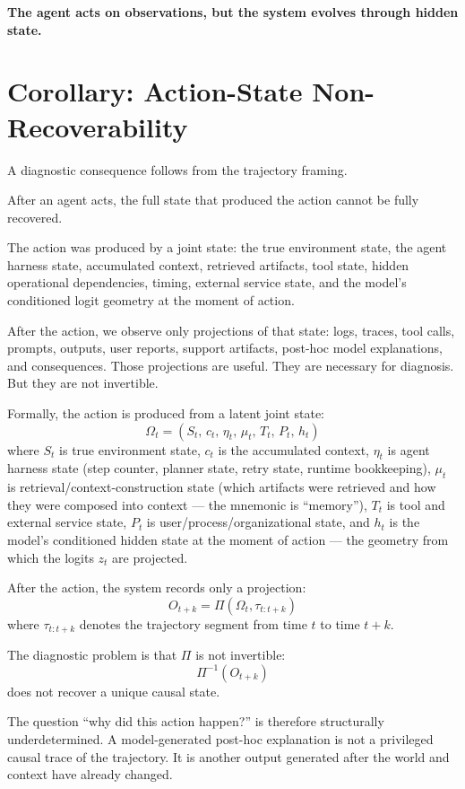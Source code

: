 \documentclass[11pt]{article}
\begin{document}
\begin{pullquote}
\textbf{The agent acts on observations, but the system evolves through hidden state.}
\end{pullquote}

\section{Corollary: Action-State Non-Recoverability}

A diagnostic consequence follows from the trajectory framing.

After an agent acts, the full state that produced the action cannot be fully recovered.

The action was produced by a joint state: the true environment state, the agent harness state, accumulated context, retrieved artifacts, tool state, hidden operational dependencies, timing, external service state, and the model's conditioned logit geometry at the moment of action.

After the action, we observe only projections of that state: logs, traces, tool calls, prompts, outputs, user reports, support artifacts, post-hoc model explanations, and consequences. Those projections are useful. They are necessary for diagnosis. But they are not invertible.

Formally, the action is produced from a latent joint state:
\[
\Omega_t = (S_t,\, c_t,\, \eta_t,\, \mu_t,\, T_t,\, P_t,\, h_t)
\]
where $S_t$ is true environment state, $c_t$ is the accumulated context, $\eta_t$ is agent harness state (step counter, planner state, retry state, runtime bookkeeping), $\mu_t$ is retrieval/context-construction state (which artifacts were retrieved and how they were composed into context --- the mnemonic is ``memory''), $T_t$ is tool and external service state, $P_t$ is user/process/organizational state, and $h_t$ is the model's conditioned hidden state at the moment of action --- the geometry from which the logits $z_t$ are projected.

After the action, the system records only a projection:
\[
O_{t+k} = \Pi(\Omega_t, \tau_{t:t+k})
\]
where $\tau_{t:t+k}$ denotes the trajectory segment from time $t$ to time $t+k$.

The diagnostic problem is that $\Pi$ is not invertible:
\[
\Pi^{-1}(O_{t+k})
\]
does not recover a unique causal state.

The question ``why did this action happen?'' is therefore structurally underdetermined. A model-generated post-hoc explanation is not a privileged causal trace of the trajectory. It is another output generated after the world and context have already changed.
\end{document}

